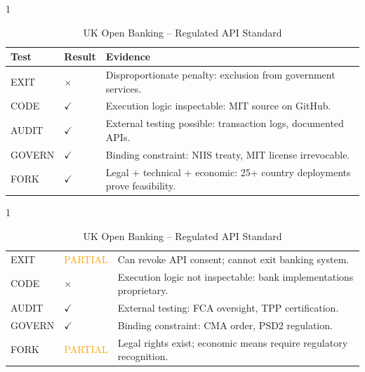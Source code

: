 \begin{table}[htbp]
    \begin{subtable}{1\textwidth}
        \centering
        \caption{X-Road (Estonia/Nordic) -- Data Exchange Layer}
        \small
        \begin{tabular}{@{}llp{8.5cm}@{}}
            \toprule
            \textbf{Test} & \textbf{Result} & \textbf{Evidence} \\
            \midrule
            EXIT & $\times$ & Disproportionate penalty: exclusion from government services. \\
            CODE & $\checkmark$ & Execution logic inspectable: MIT source on GitHub. \\
            AUDIT & $\checkmark$ & External testing possible: transaction logs, documented APIs. \\
            GOVERN & $\checkmark$ & Binding constraint: NIIS treaty, MIT license irrevocable. \\
            FORK & $\checkmark$ & Legal + technical + economic: 25+ country deployments prove feasibility. \\
            \bottomrule
        \end{tabular}
        \vspace{0.3cm}
    \end{subtable}

    \begin{subtable}{1\textwidth}
        \centering
        \caption{UK Open Banking -- Regulated API Standard}
        \small
        \begin{tabular}{@{}llp{8.5cm}@{}}
            \toprule
            EXIT & \textcolor{orange}{PARTIAL} & Can revoke API consent; cannot exit banking system. \\
            CODE & $\times$ & Execution logic not inspectable: bank implementations proprietary. \\
            AUDIT & $\checkmark$ & External testing: FCA oversight, TPP certification. \\
            GOVERN & $\checkmark$ & Binding constraint: CMA order, PSD2 regulation. \\
            FORK & \textcolor{orange}{PARTIAL} & Legal rights exist; economic means require regulatory recognition. \\
            \bottomrule
        \end{tabular}
    \end{subtable}
\end{table}

